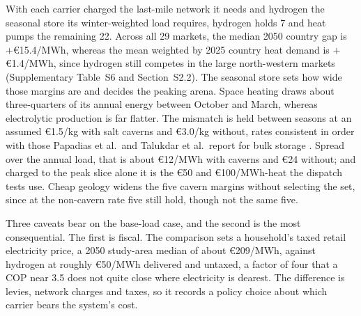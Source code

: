 With each carrier charged the last-mile network it needs and hydrogen the seasonal store
its winter-weighted load requires, hydrogen holds 7 and heat pumps the remaining 22. Across all 29 markets, the median 2050 country gap is $+$\euro{}15.4/MWh, whereas the mean weighted by 2025 country heat demand is $+$\euro{}1.4/MWh, since hydrogen still competes in the large north-western markets
(Supplementary Table~S6 and Section~S2.2). The seasonal store sets how wide those margins are and decides the peaking arena. Space heating draws about three-quarters of its annual energy between October and March, whereas electrolytic production is far flatter. The mismatch is held between seasons at an assumed \euro{}1.5/kg with salt caverns and \euro{}3.0/kg without, rates consistent in order with those Papadias et al.\ and Talukdar et al.\ report for bulk storage \citep{Lord2014GeologicStorage,Papadias2021BulkStorage,Talukdar2024UHSEurope}. Spread over the annual load, that is about \euro{}12/MWh with caverns and \euro{}24 without; and charged to the peak slice alone it is the \euro{}50 and \euro{}100/MWh-heat the dispatch tests use.
Cheap geology widens the five cavern margins without selecting the set, since at the
non-cavern rate five still hold, though not the same five.


Three caveats bear on the base-load case, and the second is the most consequential. The
first is fiscal. The comparison sets a household's taxed retail electricity price, a 2050 study-area
median of about \euro{}209/MWh, against hydrogen at roughly \euro{}50/MWh delivered and
untaxed, a factor of four that a COP near 3.5 does not
quite close where electricity is dearest. The difference is levies, network charges and
taxes, so it records a policy choice about which carrier bears the system's cost.

